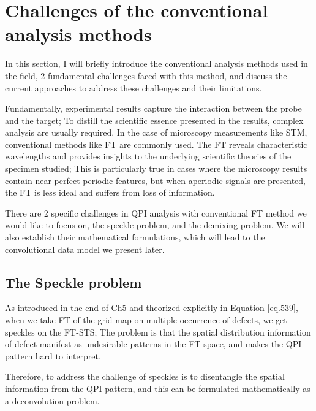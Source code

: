 \section{Challenges of the conventional analysis methods}
In this section, I will briefly introduce the conventional analysis methods used in the field, 2 fundamental challenges faced with this method, and discuss the current approaches to address these challenges and their limitations. 

Fundamentally, experimental results capture the interaction between the probe and the target; To distill the scientific essence presented in the results, complex analysis are usually required. In the case of microscopy measurements like STM, conventional methods like \ac{FT} are commonly used. %
The \ac{FT} reveals characteristic wavelengths and provides insights to the underlying scientific theories of the specimen studied; This is particularly true in cases where the microscopy results contain near perfect periodic features, but when aperiodic signals are presented, the \ac{FT} is less ideal and suffers from loss of information. 

There are 2 specific challenges in QPI analysis with conventional \ac{FT} method we would like to focus on, the speckle problem, and the demixing problem. We will also establish their mathematical formulations, which will lead to the convolutional data model we present later. 

\subsection{The Speckle problem}
As introduced in the end of Ch5 and theorized explicitly in Equation \ref{eq.539}, when we take \ac{FT} of the grid map on multiple occurrence of defects, we get speckles on the \ac{FT-STS}; The problem is that the spatial distribution information of defect manifest as undesirable patterns in the \ac{FT} space, and makes the QPI pattern hard to interpret.

Therefore, to address the challenge of speckles is to disentangle the spatial information from the \ac{QPI} pattern, and this can be formulated mathematically as a deconvolution problem. 


